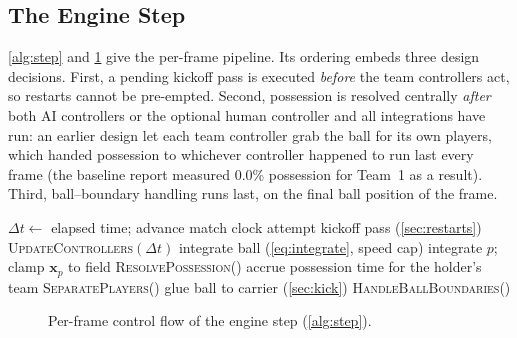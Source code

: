 \documentclass[10pt,twocolumn]{article}
\begin{document}
\subsection{The Engine Step}\label{sec:step}

\cref{alg:step} and \cref{fig:steploop} give the per-frame pipeline. Its
ordering embeds three design decisions. First, a pending kickoff pass is
executed \emph{before} the team controllers act, so restarts cannot be pre-empted.
Second, possession is resolved centrally \emph{after} both AI controllers
or the optional human controller and all integrations have run: an earlier
design let each team controller grab the ball for its own players, which
handed possession to whichever controller happened to run last every frame
(the baseline report measured 0.0\% possession for Team~1 as a result).
Third, ball--boundary handling runs last, on the final ball position of the
frame.

\begin{algorithm}[t]
\caption{Engine step (one frame).}
\label{alg:step}
\begin{algorithmic}[1]
\State $\Delta t \gets$ elapsed time; advance match clock
 \State attempt kickoff pass (\cref{sec:restarts})
\EndIf
\State \textsc{UpdateControllers}$(\Delta t)$ 
\State integrate ball (\cref{eq:integrate}, speed cap)
 integrate $p$; clamp $\mathbf x_p$ to field
\EndFor
\State \textsc{ResolvePossession()} 
\State accrue possession time for the holder's team
\State \textsc{SeparatePlayers()} 
 glue ball to carrier (\cref{sec:kick})
\EndIf
\State \textsc{HandleBallBoundaries()} 
\end{algorithmic}
\end{algorithm}

\begin{figure}[t]
\centering
{}
\caption{Per-frame control flow of the engine step (\cref{alg:step}).}
\label{fig:steploop}
\end{figure}
\end{document}
